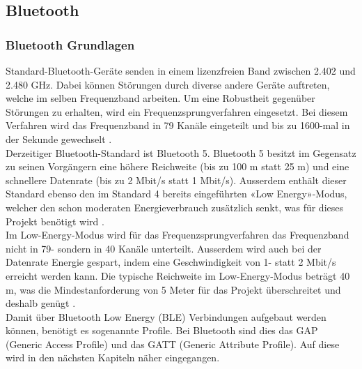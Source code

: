 \subsection{Bluetooth}\label{sec:bluetooth}

\subsubsection{Bluetooth Grundlagen}
Standard-Bluetooth-Geräte senden in einem lizenzfreien Band zwischen 2.402 und 2.480 GHz. Dabei können Störungen durch diverse andere Geräte auftreten, welche im selben Frequenzband arbeiten. Um eine Robustheit gegenüber Störungen zu erhalten, wird ein Frequenzsprungverfahren eingesetzt. Bei diesem Verfahren wird das Frequenzband in 79 Kanäle eingeteilt und bis zu 1600-mal in der Sekunde gewechselt \cite{5_Teildokument_BT}.\\[0.25cm]
Derzeitiger Bluetooth-Standard ist Bluetooth 5. Bluetooth 5 besitzt im Gegensatz zu seinen Vorgängern eine höhere Reichweite (bis zu 100 m statt 25 m) und eine schnellere Datenrate (bis zu 2 Mbit/s statt 1 Mbit/s). Ausserdem enthält dieser Standard ebenso den im Standard 4 bereits eingeführten «Low Energy»-Modus, welcher den schon moderaten Energieverbrauch zusätzlich senkt, was für dieses Projekt benötigt wird \cite{5_Teildokument_BT}.\\[0.25cm]
Im Low-Energy-Modus wird für das Frequenzsprungverfahren das Frequenzband nicht in 79- sondern in 40 Kanäle unterteilt. Ausserdem wird auch bei der Datenrate Energie gespart, indem eine Geschwindigkeit von 1- statt 2 Mbit/s erreicht werden kann. Die typische Reichweite im Low-Energy-Modus beträgt 40 m, was die Mindestanforderung von 5 Meter für das Projekt überschreitet und deshalb genügt \cite{6_Teildokument_BT}.\\[0.25cm]
Damit über Bluetooth Low Energy (BLE) Verbindungen aufgebaut werden können, benötigt es sogenannte Profile. Bei Bluetooth sind dies das GAP (Generic Access Profile) und das GATT (Generic Attribute Profile). Auf diese wird in den nächsten Kapiteln näher eingegangen.\\

